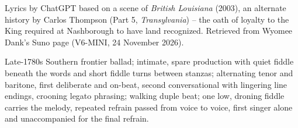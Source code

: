 
\begin{notes}
Lyrics by ChatGPT based on a scene of \emph{British Louisiana} (2003), an alternate history by Carlos Thompson (Part 5, \emph{Transylvania}) -- the oath of loyalty to the King required at Nashborough to have land recognized. Retrieved from Wyomee Dank's Suno page (V6-MINI, 24 November 2026).
\end{notes}
\begin{style}
Late-1780s Southern frontier ballad; intimate, spare production with quiet fiddle beneath the words and short fiddle turns between stanzas; alternating tenor and baritone, first deliberate and on-beat, second conversational with lingering line endings, crooning legato phrasing; walking duple beat; one low, droning fiddle carries the melody, repeated refrain passed from voice to voice, first singer alone and unaccompanied for the final refrain.
\end{style}

